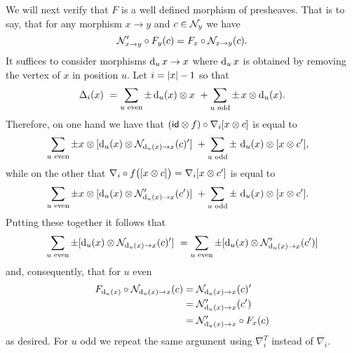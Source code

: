 We will next verify that $F$ is a well defined morphism of presheaves.
That is to say, that for any morphism $x \to y$ and $c \in \mathcal{N}_y$ we have
\[
\mathcal{N}'_{x \to y} \circ F_y(c) = F_x \circ \mathcal{N}_{x \to y}(c).
\]
It suffices to consider morphisms $\operatorname{d}_u x \to x$ where $\operatorname{d}_u x$ is obtained by removing the vertex of $x$ in position $u$.
Let $i = \lvert x\rvert-1$ so that
\[
\Delta_i(x) \ =
\sum_{u \text{ even}} \pm \operatorname{d}_u(x) \otimes x \ +
\sum_{u \text{ odd}} \pm \, x \otimes \operatorname{d}_u(x).
\]
Therefore, on one hand we have that $(\mathsf{id} \otimes f) \circ \nabla_i [x \otimes c]$ is equal to
\begin{align*}
	&\sum_{u \text{ even}} \pm x \otimes [\operatorname{d}_u(x) \otimes \mathcal{N}_{\operatorname{d}_u(x) \to x}(c)'] \ +
	\sum_{u \text{ odd}} \pm \, \operatorname{d}_u(x) \otimes [x \otimes c'],
\end{align*}
while on the other that $\nabla_i \circ f \big( [x \otimes c] \big) = \nabla_i [x \otimes c']$ is equal to
\begin{align*}
	&\sum_{u \text{ even}} \pm x \otimes [\operatorname{d}_u(x) \otimes \mathcal{N}'_{\operatorname{d}_u(x) \to x}(c')] \ +
	\sum_{u \text{ odd}} \pm \, \operatorname{d}_u(x) \otimes [x \otimes c'].
\end{align*}
Putting these together it follows that
\[
	\sum_{u \text{ even}} \pm [\operatorname{d}_u(x) \otimes \mathcal{N}_{\operatorname{d}_u(x) \to x}(c)'] \ =
	\sum_{u \text{ even}} \pm [\operatorname{d}_u(x) \otimes \mathcal{N}'_{\operatorname{d}_u(x) \to x}(c')]
\]
and, consequently, that for $u$ even
\begin{align*}
	F_{\operatorname{d}_u(x)} \circ \mathcal{N}_{\operatorname{d}_u(x) \to x}(c) &=
	\mathcal{N}_{\operatorname{d}_u(x) \to x}(c)' \\ &=
	\mathcal{N}'_{\operatorname{d}_u(x) \to x}(c') \\ &=
	\mathcal{N}'_{\operatorname{d}_u(x) \to x} \circ F_{x}(c)
\end{align*}
as desired.
For $u$ odd we repeat the same argument using $\nabla_i^T$ instead of $\nabla_i$.
